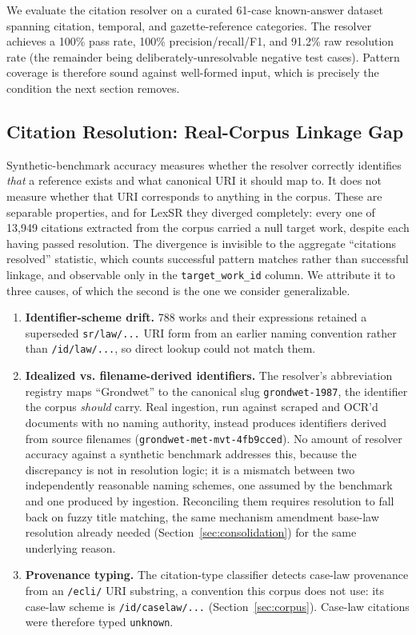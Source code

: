 \documentclass{IOS-Book-Article}
\begin{document}
We evaluate the citation resolver on a curated 61-case known-answer dataset spanning
citation, temporal, and gazette-reference categories. The resolver achieves a 100\% pass
rate, 100\% precision/recall/F1, and 91.2\% raw resolution rate (the remainder being
deliberately-unresolvable negative test cases). Pattern coverage is therefore sound against
well-formed input, which is precisely the condition the next section removes.

\subsection{Citation Resolution: Real-Corpus Linkage Gap}
\label{sec:linkage-gap}

Synthetic-benchmark accuracy measures whether the resolver correctly identifies \emph{that} a
reference exists and what canonical URI it should map to. It does not measure whether that
URI corresponds to anything in the corpus. These are separable properties, and for LexSR
they diverged completely: every one of 13,949 citations extracted from the corpus carried a
null target work, despite each having passed resolution. The divergence is invisible to the
aggregate ``citations resolved'' statistic, which counts successful pattern matches rather
than successful linkage, and observable only in the \texttt{target\_work\_id} column. We
attribute it to three causes, of which the second is the one we consider generalizable.

\begingroup\sloppy
\begin{enumerate}
\item \textbf{Identifier-scheme drift.} 788 works and their expressions retained a superseded
   \texttt{sr/law/...} URI form from an earlier naming convention rather than \texttt{/id/law/...},
   so direct lookup could not match them.
\item \textbf{Idealized vs. filename-derived identifiers.} The resolver's abbreviation registry maps
   ``Grondwet'' to the canonical slug \texttt{grondwet-1987}, the identifier the corpus
   \emph{should} carry. Real ingestion, run against scraped and OCR'd documents with no
   naming authority, instead produces identifiers derived from source filenames
   (\texttt{grondwet-met-mvt-\allowbreak{}4fb9cced}). No amount of resolver accuracy against a synthetic
   benchmark addresses this, because the discrepancy is not in resolution logic; it is a
   mismatch between two independently reasonable naming schemes, one assumed by the
   benchmark and one produced by ingestion. Reconciling them requires resolution to fall
   back on fuzzy title matching, the same mechanism amendment base-law resolution already
   needed (Section~\ref{sec:consolidation}) for the same underlying reason.
\item \textbf{Provenance typing.} The citation-type classifier detects case-law provenance from
   an \texttt{/ecli/} URI substring, a convention this corpus does not use: its case-law
   scheme is \texttt{/id/caselaw/...} (Section~\ref{sec:corpus}). Case-law citations were
   therefore typed \texttt{unknown}.
\end{enumerate}
\endgroup
\end{document}
